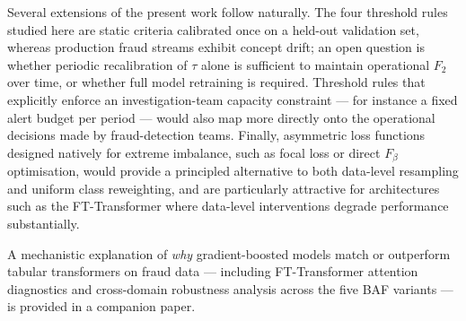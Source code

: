 \documentclass[a4paper,fleqn]{cas-sc}
\begin{document}
Several extensions of the present work follow naturally. The four threshold rules
studied here are static criteria calibrated once on a held-out validation set, whereas
production fraud streams exhibit concept drift; an open question is whether periodic
recalibration of $\tau$ alone is sufficient to maintain operational $F_2$ over time,
or whether full model retraining is required. Threshold rules that explicitly enforce
an investigation-team capacity constraint --- for instance a fixed alert budget per
period --- would also map more directly onto the operational decisions made by
fraud-detection teams. Finally, asymmetric loss functions designed natively for
extreme imbalance, such as focal loss or direct $F_\beta$ optimisation, would provide
a principled alternative to both data-level resampling and uniform class reweighting,
and are particularly attractive for architectures such as the FT-Transformer where
data-level interventions degrade performance substantially.

A mechanistic explanation of \emph{why} gradient-boosted models match or outperform
tabular transformers on fraud data --- including FT-Transformer attention diagnostics
and cross-domain robustness analysis across the five BAF variants --- is provided in
a companion paper.

\printcredits



\end{document}
